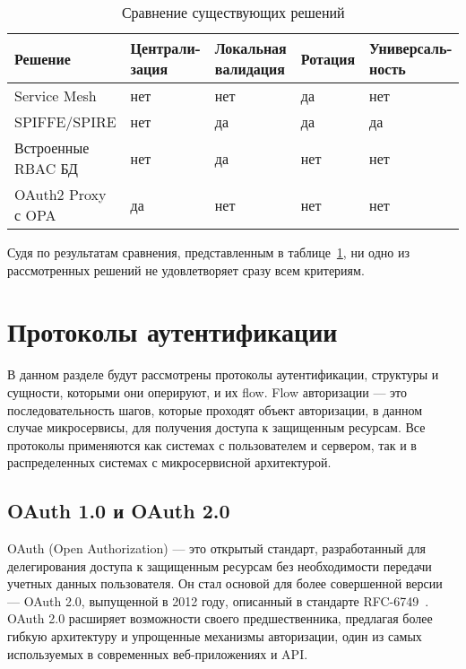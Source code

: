 \begin{table}[H]
\captionsetup{justification=centering}
\caption{Сравнение существующих решений}
\label{tabular:comparison}
\begin{tabular}{|p{3.5cm}|p{3cm}|p{2.5cm}|p{2cm}|p{3cm}|}
\hline
\textbf{Решение} & \textbf{Централи- зация} & \textbf{Локальная валидация} & \textbf{Ротация} & \textbf{Универсаль- ность}
\tabularnewline
\hline
Service Mesh & нет & нет & да & нет 
\tabularnewline
\hline
SPIFFE/SPIRE	 & нет & да & да & да
\tabularnewline
\hline
Встроенные RBAC БД & нет & да & нет & нет 
\tabularnewline
\hline
OAuth2 Proxy с OPA & да & нет & нет & нет
\tabularnewline
\hline

\end{tabular}
\end{table}

Судя по результатам сравнения, представленным в таблице~\ref{tabular:comparison}, ни одно из рассмотренных решений не удовлетворяет сразу всем критериям.

\section{Протоколы аутентификации}
В данном разделе будут рассмотрены протоколы аутентификации, структуры и сущности, которыми они оперируют, и их flow. Flow авторизации --- это последовательность шагов, которые проходят объект авторизации, в данном случае микросервисы, для получения доступа к защищенным ресурсам.
Все протоколы применяются как системах с пользователем и сервером, так и в распределенных системах с микросервисной архитектурой.

\subsection{OAuth 1.0 и OAuth 2.0}
OAuth (Open Authorization) --- это открытый стандарт, разработанный для делегирования доступа к защищенным ресурсам без необходимости передачи учетных данных пользователя. Он стал основой для более совершенной версии — OAuth 2.0, выпущенной в 2012 году, описанный в стандарте RFC-6749~\cite{oauth2_spec}. OAuth 2.0 расширяет возможности своего предшественника, предлагая более гибкую архитектуру и упрощенные механизмы авторизации, один из самых используемых в современных веб-приложениях и API.~\cite{oauth2_artc}


